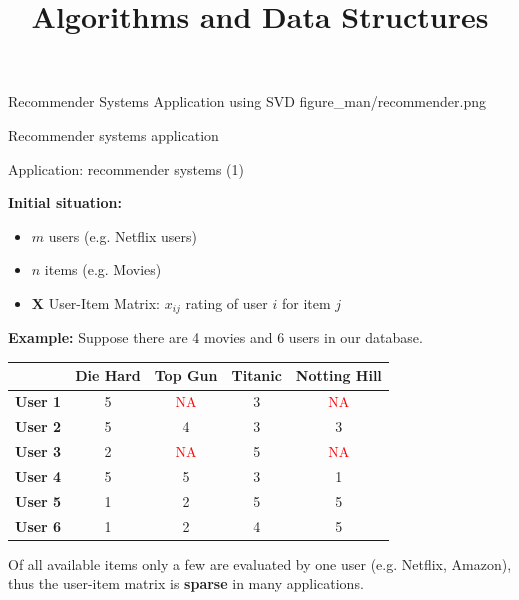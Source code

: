 \documentclass[11pt,compress,t,notes=noshow, xcolor=table]{beamer}
\title{Algorithms and Data Structures}
\begin{document}
{Recommender Systems Application using SVD}
{figure_man/recommender.png}
{
  \item Recommender systems application
}

\begin{vbframe}{Application: recommender systems (1)}

\textbf{Initial situation:}
\begin{itemize}
\item $m$ users (e.g. Netflix users)
\item $n$ items (e.g. Movies)
\item $\mathbf{X}$ User-Item Matrix: $x_{ij}$ rating of user $i$ for item $j$
\end{itemize}

\vspace*{0.5cm}

\textbf{Example:} Suppose there are 4 movies and 6 users in our database.

\vspace*{0.5cm}

\begin{footnotesize}
\begin{center}
\begin{table}[h!]
    \centering
    \begin{tabular}{|l|c|c|c|c|}
    \hline
           & \textbf{Die Hard} & \textbf{Top Gun} & \textbf{Titanic} & \textbf{Notting Hill} \\ \hline
    \textbf{User 1} & 5 & \textcolor{red}{NA} & 3 & \textcolor{red}{NA} \\ \hline
    \textbf{User 2} & 5 & 4 & 3 & 3 \\ \hline
    \textbf{User 3} & 2 & \textcolor{red}{NA} & 5 & \textcolor{red}{NA} \\ \hline
    \textbf{User 4} & 5 & 5 & 3 & 1 \\ \hline
    \textbf{User 5} & 1 & 2 & 5 & 5 \\ \hline
    \textbf{User 6} & 1 & 2 & 4 & 5 \\ \hline
    \end{tabular}
  \end{table}    
\end{center}
\end{footnotesize}

Of all available items only a few are evaluated by one user (e.g. Netflix, Amazon), thus the user-item matrix is \textbf{sparse} in many applications.


\end{vbframe}
\end{document}
